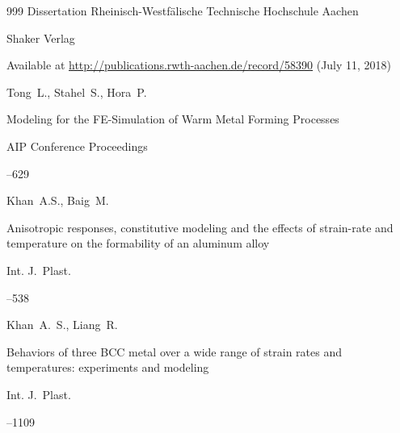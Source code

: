 \begin{thebibliography}{999}
\thesisinfo Dissertation  Rheinisch-Westf\"alische  Technische  Hochschule Aachen

\publaddr Shaker Verlag 


\elink Available at \url{http://publications.rwth-aachen.de/record/58390} (July 11, 2018)








\by Tong~L., Stahel~S., Hora~P.

\paper Modeling for the FE-Simulation of Warm Metal Forming Processes

\jour AIP Conference Proceedings 




--629






\by Khan~A.S., Baig~M. 

\paper Anisotropic responses, constitutive modeling and the effects of strain-rate and temperature on the formability of an aluminum alloy

\jour Int. J.~Plast.  




--538






\by Khan~A.~S., Liang~R.


\paper Behaviors of three BCC metal over a wide range of strain rates and temperatures: experiments and modeling

\jour Int. J.~Plast. 



–1109






\end{thebibliography}
